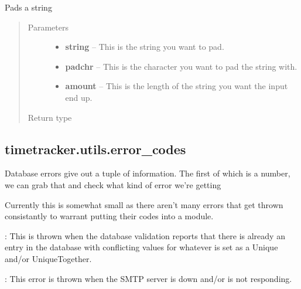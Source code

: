 \documentclass[letterpaper,10pt,english]{sphinxmanual}
\begin{document}

\begin{fulllineitems}
\label{timetracker:timetracker.utils.datemaps.pad}
Pads a string
\begin{quote}\begin{description}
\item[{Parameters}] \leavevmode\begin{itemize}
\item {} 
\textbf{string} -- This is the string you want to pad.

\item {} 
\textbf{padchr} -- This is the character you want to pad the string with.

\item {} 
\textbf{amount} -- This is the length of the string you want the input end up.

\end{itemize}

\item[{Return type}] \leavevmode
{}

\end{description}\end{quote}

\end{fulllineitems}



\subsection{timetracker.utils.error\_codes}
\label{timetracker:timetracker-utils-error-codes}\label{timetracker:module-timetracker.utils.error_codes}
Database errors give out a tuple of information. The first of which is a
number, we can grab that and check what kind of error we're getting

Currently this is somewhat small as there aren't many errors that get thrown
consistantly to warrant putting their codes into a module.

: This is thrown when the database validation reports
that there is already an entry in the database with conflicting values for
whatever is set as a Unique and/or UniqueTogether.

: This error is thrown when the SMTP server is down
and/or is not responding.
\end{document}
